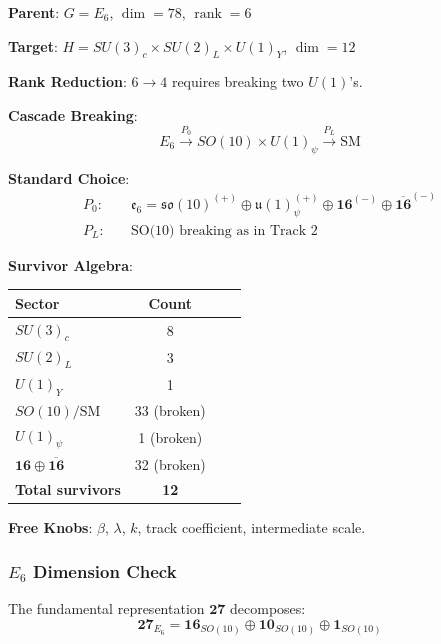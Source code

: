 \documentclass[11pt,a4paper]{article}
\DeclareMathOperator{\rank}{rank}
\begin{document}
\begin{trackbox}[$E_6$ BC Selection]
\textbf{Parent}: $G = E_6$, $\dim = 78$, $\rank = 6$

\textbf{Target}: $H = SU(3)_c \times SU(2)_L \times U(1)_Y$, $\dim = 12$

\textbf{Rank Reduction}: $6 \to 4$ requires breaking two $U(1)$'s.

\textbf{Cascade Breaking}:
\begin{equation}
\label{eq:e6-cascade}
E_6 \xrightarrow{P_0} SO(10) \times U(1)_\psi \xrightarrow{P_L} \text{SM}
\end{equation}

\textbf{Standard Choice}:
\begin{align}
\label{eq:e6-P0}
P_0: \quad & \mathfrak{e}_6 = \mathfrak{so}(10)^{(+)} \oplus \mathfrak{u}(1)_\psi^{(+)}
\oplus \mathbf{16}^{(-)} \oplus \overline{\mathbf{16}}^{(-)} \\
\label{eq:e6-PL}
P_L: \quad & \text{SO(10) breaking as in Track 2}
\end{align}

\textbf{Survivor Algebra}:
\begin{center}
\begin{tabular}{lccc}
\toprule
Sector & Count \\
\midrule
$SU(3)_c$ & 8 \\
$SU(2)_L$ & 3 \\
$U(1)_Y$ & 1 \\
$SO(10)/\text{SM}$ & 33 (broken) \\
$U(1)_\psi$ & 1 (broken) \\
$\mathbf{16} \oplus \overline{\mathbf{16}}$ & 32 (broken) \\
\midrule
\textbf{Total survivors} & \textbf{12} \\
\bottomrule
\end{tabular}
\end{center}

\textbf{Free Knobs}: $\beta$, $\lambda$, $k$, track coefficient, intermediate scale.
\end{trackbox}

\subsubsection{$E_6$ Dimension Check}

The fundamental representation $\mathbf{27}$ decomposes:
\begin{equation}
\label{eq:e6-27-decomp}
\mathbf{27}_{E_6} = \mathbf{16}_{SO(10)} \oplus \mathbf{10}_{SO(10)} \oplus \mathbf{1}_{SO(10)}
\end{equation}
\end{document}
